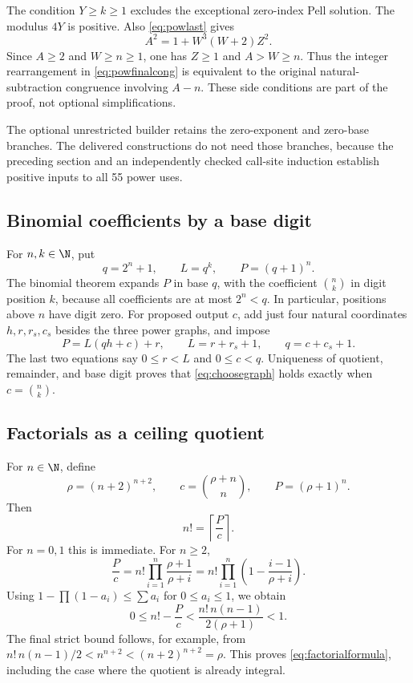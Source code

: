 The condition $Y\ge k\ge1$ excludes the exceptional zero-index Pell
solution. The modulus $4Y$ is positive. Also \eqref{eq:powlast} gives
\[
 A^2=1+W^3(W+2)Z^2.
\]
Since $A\ge2$ and $W\ge n\ge1$, one has $Z\ge1$ and $A>W\ge n$.
Thus the integer rearrangement in \eqref{eq:powfinalcong} is equivalent
to the original natural-subtraction congruence involving $A-n$.
These side conditions are part of the proof, not optional simplifications.

The optional unrestricted builder retains the zero-exponent and zero-base
branches. The delivered constructions do not need those branches, because
the preceding section and an independently checked call-site induction
establish positive inputs to all 55 power uses.

\subsection{Binomial coefficients by a base digit}

For $n,k\in\N$, put
\[
 q=2^n+1,\qquad L=q^k,\qquad P=(q+1)^n.
\]
The binomial theorem expands $P$ in base $q$, with the coefficient
$\binom nk$ in digit position $k$, because all coefficients are at most
$2^n<q$. In particular, positions above $n$ have digit zero.
For proposed output $c$, add just four natural coordinates $h,r,r_s,c_s$
besides the three power graphs, and impose
\begin{equation}\label{eq:choosegraph}
 P=L(qh+c)+r,\qquad L=r+r_s+1,\qquad q=c+c_s+1.
\end{equation}
The last two equations say $0\le r<L$ and $0\le c<q$. Uniqueness of
quotient, remainder, and base digit proves that \eqref{eq:choosegraph}
holds exactly when $c=\binom nk$.

\subsection{Factorials as a ceiling quotient}

For $n\in\N$, define
\[
 \rho=(n+2)^{n+2},\qquad c=\binom{\rho+n}{n},\qquad P=(\rho+1)^n.
\]
Then
\begin{equation}\label{eq:factorialformula}
 n!=\left\lceil\frac Pc\right\rceil.
\end{equation}
For $n=0,1$ this is immediate. For $n\ge2$,
\[
 \frac Pc=n!\prod_{i=1}^n\frac{\rho+1}{\rho+i}
 =n!\prod_{i=1}^n\left(1-\frac{i-1}{\rho+i}\right).
\]
Using $1-\prod(1-a_i)\le\sum a_i$ for $0\le a_i\le1$, we obtain
\[
 0\le n!-\frac Pc
 <\frac{n!\,n(n-1)}{2(\rho+1)}<1.
\]
The final strict bound follows, for example, from
$n!\,n(n-1)/2<n^{n+2}<(n+2)^{n+2}=\rho$.
This proves \eqref{eq:factorialformula}, including the case where the
quotient is already integral.

